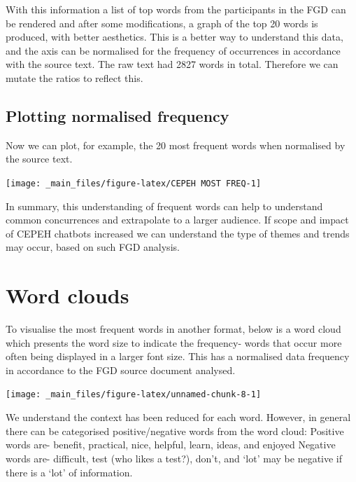 \documentclass[a4paper, nobind]{templates/ociamthesis}
\begin{document}
With this information a list of top words from the participants in the
FGD can be rendered and after some modifications, a graph of the top 20
words is produced, with better aesthetics. This is a better way to
understand this data, and the axis can be normalised for the frequency
of occurrences in accordance with the source text. The raw text had 2827
words in total. Therefore we can mutate the ratios to reflect this.

\hypertarget{plotting-normalised-frequency}{%
\subsection{Plotting normalised frequency}\label{plotting-normalised-frequency}}

Now we can plot, for example, the 20 most frequent words when normalised
by the source text.

\begin{center}\texttt{[image: \_main\_files/figure-latex/CEPEH MOST FREQ-1]} \end{center}

In summary, this understanding of frequent words can help to understand
common concurrences and extrapolate to a larger audience. If scope and
impact of CEPEH chatbots increased we can understand the type of themes
and trends may occur, based on such FGD analysis.

\hypertarget{word-clouds}{%
\section{Word clouds}\label{word-clouds}}

To visualise the most frequent words in another format, below is a word
cloud which presents the word size to indicate the frequency- words that
occur more often being displayed in a larger font size. This has a
normalised data frequency in accordance to the FGD source document
analysed.

\begin{center}\texttt{[image: \_main\_files/figure-latex/unnamed-chunk-8-1]} \end{center}

We understand the context has been reduced for each word. However, in
general there can be categorised positive/negative words from the word
cloud: Positive words are- benefit, practical, nice, helpful, learn,
ideas, and enjoyed Negative words are- difficult, test (who likes a
test?), don't, and `lot' may be negative if there is a `lot' of
information.
\end{document}

